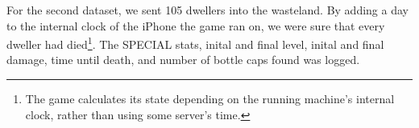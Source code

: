 For the second dataset, we sent 105 dwellers into the wasteland. By adding a day to the internal clock of the iPhone the game ran on, we were sure that every dweller had died\footnote{The game calculates its state depending on the running machine's internal clock, rather than using some server's time.}. The SPECIAL stats, inital and final level, inital and final damage, time until death, and number of bottle caps found was logged.